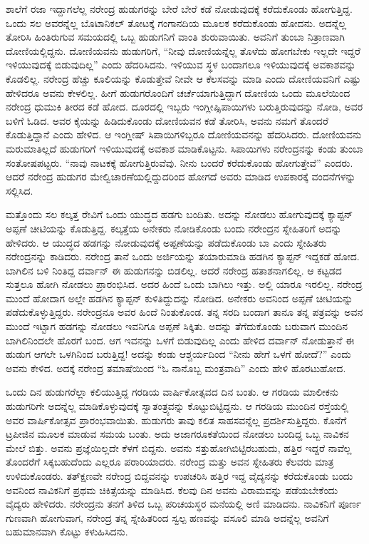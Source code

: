 ಶಾಲೆಗೆ ರಜಾ ಇದ್ದಾಗಲೆಲ್ಲ ನರೇಂದ್ರ ಹುಡುಗರನ್ನು ಬೇರೆ ಬೇರೆ ಕಡೆ ನೋಡುವುದಕ್ಕೆ ಕರೆದುಕೊಂಡು ಹೋಗುತ್ತಿದ್ದ. ಒಂದು ಸಲ ಅವರನ್ನೆಲ್ಲ ಬೊಟಾನಿಕಲ್ ತೋಟಕ್ಕೆ ಗಂಗಾನದಿಯ ಮೂಲಕ ಕರೆದುಕೊಂಡು ಹೋದನು. ಅದನ್ನೆಲ್ಲ ತೋರಿಸಿ ಹಿಂತಿರುಗುವ ಸಮಯದಲ್ಲಿ ಒಬ್ಬ ಹುಡುಗನಿಗೆ ವಾಂತಿ ಶುರುವಾಯಿತು. ಅವನಿಗೆ ತುಂಬಾ ನಿತ್ರಾಣವಾಗಿ ದೋಣಿಯಲ್ಲಿದ್ದನು. ದೋಣಿಯವನು ಹುಡುಗರಿಗೆ, “ನೀವು ದೋಣಿಯನ್ನೆಲ್ಲ ತೊಳೆದು ಹೋಗಬೇಕು ಇಲ್ಲದೇ ಇದ್ದರೆ ಇಳಿಯುವುದಕ್ಕೆ ಬಿಡುವುದಿಲ್ಲ” ಎಂದು ಹೆದರಿಸಿದನು. ಇಳಿಯುವ ಸ್ಥಳ ಬಂದಾಗಲೂ ಇಳಿಯುವುದಕ್ಕೆ ಅವಕಾಶವನ್ನು ಕೊಡಲಿಲ್ಲ. ನರೇಂದ್ರ ಹೆಚ್ಚು ಕೂಲಿಯನ್ನು ಕೊಡುತ್ತೇವೆ ನೀವೇ ಆ ಕೆಲಸವನ್ನು ಮಾಡಿ ಎಂದು ದೋಣಿಯವನಿಗೆ ಎಷ್ಟು ಹೇಳಿದರೂ ಅವನು ಕೇಳಲಿಲ್ಲ. ಹೀಗೆ ಹುಡುಗರೊಂದಿಗೆ ಚರ್ಚೆಯಾಗುತ್ತಿದ್ದಾಗ ದೋಣಿಯ ಒಂದು ಮೂಲೆಯಿಂದ ನರೇಂದ್ರ ಧುಮುಕಿ ತೀರದ ಕಡೆ ಹೋದ. ದೂರದಲ್ಲಿ ಇಬ್ಬರು ಇಂಗ್ಲೀಷ್\break ಸಿಪಾಯಿಗಳು ಬರುತ್ತಿರುವುದನ್ನು ನೋಡಿ, ಅವರ ಬಳಿಗೆ ಓಡಿದ. ಅವರ ಕೈಯನ್ನು ಹಿಡಿದುಕೊಂಡು ದೋಣಿಯವನ ಕಡೆ ತೋರಿಸಿ, ಅವನು ನಮಗೆ ತೊಂದರೆ ಕೊಡುತ್ತಿದ್ದಾನೆ ಎಂದು ಹೇಳಿದ. ಆ ಇಂಗ್ಲೀಷ್ ಸಿಪಾಯಿಗಳಿಬ್ಬರೂ ದೋಣಿಯವನನ್ನು ಹೆದರಿಸಿದರು. ದೋಣಿಯವನು ಮರುಮಾತಿಲ್ಲದೆ ಹುಡುಗರಿಗೆ ಇಳಿಯುವುದಕ್ಕೆ ಅವಕಾಶ ಮಾಡಿಕೊಟ್ಟನು. ಸಿಪಾಯಿಗಳು ನರೇಂದ್ರನನ್ನು ಕಂಡು ತುಂಬಾ ಸಂತೋಷಪಟ್ಟರು. “ನಾವು ನಾಟಕಕ್ಕೆ ಹೋಗುತ್ತಿರುವೆವು. ನೀನು ಬಂದರೆ ಕರೆದುಕೊಂಡು ಹೋಗುತ್ತೇವೆ” ಎಂದರು. ಆದರೆ ನರೇಂದ್ರ ಹುಡುಗರ ಮೇಲ್ವಿಚಾರಣೆಯಲ್ಲಿದ್ದುದರಿಂದ ಹೋಗದೆ ಅವರು ಮಾಡಿದ ಉಪಕಾರಕ್ಕೆ ವಂದನೆಗಳನ್ನು ಸಲ್ಲಿಸಿದ.

ಮತ್ತೊಂದು ಸಲ ಕಲ್ಕತ್ತ ರೇವಿಗೆ ಒಂದು ಯುದ್ಧದ ಹಡಗು ಬಂದಿತು. ಅದನ್ನು ನೋಡಲು ಹೋಗುವುದಕ್ಕೆ ಕ್ಯಾಪ್ಟನ್ ಅಪ್ಪಣೆ ಚೀಟಿಯನ್ನು ಕೊಡುತ್ತಿದ್ದ. ಕಲ್ಕತ್ತೆಯ ಅನೇಕರು ನೋಡಿಕೊಂಡು ಬಂದು ನರೇಂದ್ರನ ಸ್ನೇಹಿತರಿಗೆ ಅದನ್ನು ಹೇಳಿದರು. ಆ ಯುದ್ಧದ ಹಡಗನ್ನು ನೋಡುವುದಕ್ಕೆ ಅಪ್ಪಣೆಯನ್ನು ಪಡೆದುಕೊಂಡು ಬಾ ಎಂದು ಸ್ನೇಹಿತರು ನರೇಂದ್ರನನ್ನು ಕಾಡಿದರು. ನರೇಂದ್ರ ತಾನೆ ಒಂದು ಅರ್ಜಿಯನ್ನು ತಯಾರುಮಾಡಿ ಹಡಗಿನ ಕ್ಯಾಪ್ಟನ್ ಇದ್ದಕಡೆ ಹೋದ. ಬಾಗಿಲಿನ ಬಳಿ ನಿಂತಿದ್ದ ದರ್ವಾನ್ ಈ ಹುಡುಗನನ್ನು ಬಿಡಲಿಲ್ಲ. ಆದರೆ ನರೇಂದ್ರ ಹತಾಶನಾಗಲಿಲ್ಲ. ಆ ಕಟ್ಟಡದ ಸುತ್ತಲೂ ಹೋಗಿ ನೋಡಲು ಪ್ರಾರಂಭಿಸಿದ. ಅದರ ಹಿಂದೆ ಒಂದು ಬಾಗಿಲು ಇತ್ತು. ಅಲ್ಲಿ ಯಾರೂ ಇರಲಿಲ್ಲ. ನರೇಂದ್ರ ಮುಂದೆ ಹೋದಾಗ ಅಲ್ಲೇ ಹಡಗಿನ ಕ್ಯಾಪ್ಟನ್ ಕುಳಿತಿದ್ದುದನ್ನು ನೋಡಿದ. ಅನೇಕರು ಅವನಿಂದ ಅಪ್ಪಣೆ ಚೀಟಿಯನ್ನು ಪಡೆದುಕೊಳ್ಳುತ್ತಿದ್ದರು. ನರೇಂದ್ರನೂ ಅವರ ಹಿಂದೆ ನಿಂತುಕೊಂಡ. ತನ್ನ ಸರದಿ ಬಂದಾಗ ತಾನೂ ತನ್ನ ಪತ್ರವನ್ನು ಅವನ ಮುಂದೆ ಇಟ್ಟಾಗ ಹಡಗನ್ನು ನೋಡಲು ಇವನಿಗೂ ಅಪ್ಪಣೆ ಸಿಕ್ಕಿತು. ಅದನ್ನು ತೆಗೆದುಕೊಂಡು ಬರುವಾಗ ಮುಂದಿನ ಬಾಗಿಲಿನಿಂದಲೇ ಹೊರಗೆ ಬಂದ. ಆಗ ಇವನನ್ನು ಒಳಗೆ ಬಿಡುವುದಿಲ್ಲ ಎಂದು ಹೇಳಿದ ದರ್ವಾನ್ ನೋಡುತ್ತಾನೆ ಈ ಹುಡುಗ ಆಗಲೇ ಒಳಗಿನಿಂದ ಬರುತ್ತಿದ್ದ! ಅದನ್ನು ಕಂಡು ಆಶ್ಚರ್ಯದಿಂದ “ನೀನು ಹೇಗೆ ಒಳಗೆ ಹೋದೆ?” ಎಂದು ಅವನು ಕೇಳಿದ. ಅದಕ್ಕೆ ನರೇಂದ್ರ ತಮಾಷೆಯಿಂದ “ಓ ನಾನೊಬ್ಬ ಮಂತ್ರವಾದಿ” ಎಂದು ಹೇಳಿ ಹೊರಟುಹೋದ.

ಒಂದು ದಿನ ಹುಡುಗರೆಲ್ಲಾ ಕಲಿಯುತ್ತಿದ್ದ ಗರಡಿಯ ವಾರ್ಷಿಕೋತ್ಸವದ ದಿನ ಬಂತು. ಆ ಗರಡಿಯ ಮಾಲೀಕನು ಹುಡುಗರಿಗೇ ಅದನ್ನೆಲ್ಲ ಮಾಡಿಕೊಳ್ಳುವುದಕ್ಕೆ ಸ್ವಾತಂತ್ರ್ಯವನ್ನು ಕೊಟ್ಟುಬಿಟ್ಟಿದ್ದನು. ಆ ಗರಡಿಯ ಮುಂದಿನ ರಸ್ತೆಯಲ್ಲಿ ಅವರ ವಾರ್ಷಿಕೋತ್ಸವ ಪ್ರಾರಂಭವಾಯಿತು. ಹುಡುಗರು ತಾವು ಕಲಿತ ಸಾಹಸವನ್ನೆಲ್ಲ ಪ್ರದರ್ಶಿಸುತ್ತಿದ್ದರು. ಕೊನೆಗೆ ಟ್ರಪೀಜಿನ ಮೂಲಕ ಮಾಡುವ ಸಮಯ ಬಂತು. ಅದು ಅಜಾಗರೂಕತೆಯಿಂದ ನೋಡಲು ಬಂದಿದ್ದ ಒಬ್ಬ ನಾವಿಕನ ಮೇಲೆ ಬಿತ್ತು. ಅವನು ಪ್ರಜ್ಞೆಯಿಲ್ಲದೇ ಕೆಳಗೆ ಬಿದ್ದನು. ಅವನು ಸತ್ತುಹೋಗಿಬಿಟ್ಟಿರಬಹುದು, ಹತ್ತಿರ ಇದ್ದರೆ ನಾವೆಲ್ಲ ತೊಂದರೆಗೆ ಸಿಕ್ಕಬಹುದೆಂದು ಎಲ್ಲರೂ ಪರಾರಿಯಾದರು. ನರೇಂದ್ರ ಮತ್ತು ಅವನ ಸ್ನೇಹಿತರು ಕೆಲವರು ಮಾತ್ರ ಉಳಿದುಕೊಂಡರು. ತತ್‍ಕ್ಷಣವೇ ನರೇಂದ್ರ ಬಿದ್ದವನನ್ನು ಉಪಚರಿಸಿ ಹತ್ತಿರ ಇದ್ದ ವೈದ್ಯನನ್ನು ಕರೆದುಕೊಂಡು ಬಂದು ಅವನಿಂದ ನಾವಿಕನಿಗೆ ಪ್ರಥಮ ಚಿಕಿತ್ಸೆಯನ್ನು ಮಾಡಿಸಿದ. ಕೆಲವು ದಿನ ಅವನು ವಿರಾಮವನ್ನು ಪಡೆಯಬೇಕೆಂದು ವೈದ್ಯರು ಹೇಳಿದರು. ನರೇಂದ್ರನು ತನಗೆ ತಿಳಿದ ಒಬ್ಬ ಪರಿಚಯಸ್ಥರ ಮನೆಯಲ್ಲಿ ಅಣಿ ಮಾಡಿದನು. ನಾವಿಕನಿಗೆ ಪೂರ್ಣ ಗುಣವಾಗಿ ಹೋಗುವಾಗ, ನರೇಂದ್ರ ತನ್ನ ಸ್ನೇಹಿತರಿಂದ ಸ್ವಲ್ಪ ಹಣವನ್ನು ವಸೂಲಿ ಮಾಡಿ ಅದನ್ನೆಲ್ಲ ಅವನಿಗೆ ಬಹುಮಾನವಾಗಿ ಕೊಟ್ಟು ಕಳುಹಿಸಿದನು.


